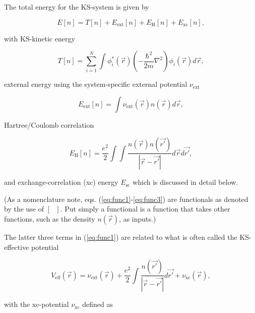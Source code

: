         The total energy for the KS-system is given by
        
        \begin{equation}
        \label{eq:func1}
            E[n] = T[n] + E_\text{ext}[n] + E_\text{H}[n] + E_\text{xc}[n],
        \end{equation}
        
        \noindent with KS-kinetic energy
        
        \begin{equation}
        \label{eq:func2}
            T[n] = \sum\limits_{i=1}^N \int \phi_i^*(\Vec{r})\left(-\frac{\hbar^2}{2m}\nabla^2 \right)\phi_i(\Vec{r})d\Vec{r},
        \end{equation}
        
        \noindent external energy using the system-specific external potential $\nu_\text{ext}$
        
        \begin{equation}
            E_\text{ext}[n] = \int \nu_\text{ext}(\Vec{r}) n(\Vec{r})d\Vec{r},
        \end{equation}
        
        \noindent Hartree/Coulomb correlation 
        
        \begin{equation}
        \label{eq:func3}
            E_\text{H}[n] = \frac{e^2}{2}\int\int \frac{n(\Vec{r})n(\Vec{r'})}{|\Vec{r} - \Vec{r'}|}d\Vec{r}d\Vec{r'}, 
        \end{equation}
        
        \noindent and exchange-correlation (xc) energy $E_\text{sc}$ which is discussed in detail below. 
        
        (As a nomenclature note, eqs. (\ref{eq:func1}-\ref{eq:func3}) are functionals as denoted by the use of $[\text{ }]$. Put simply a functional is a function that takes other functions, such as the density $n(\Vec{r})$, as inputs.)
        
        The latter three terms in (\ref{eq:func1}) are related to what is often called the KS-effective potential
        
        \begin{equation}
            V_\text{eff}(\Vec{r}) = \nu_\text{ext}(\Vec{r}) + \frac{e^2}{2}\int \frac{n(\Vec{r'})}{|\Vec{r}- \Vec{r'}|} d\Vec{r'} + \nu_\text{xc}(\Vec{r}),
        \end{equation}
        
        \noindent with the xc-potential $\nu_\text{xc}$ defined as
        
